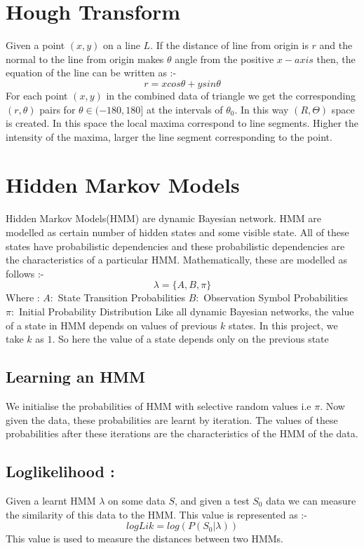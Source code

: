\documentclass[a4paper, 10pt, notitlepage]{report}
\begin{document}
\chapter{Hough Transform}
\hspace*{10pt} Given a point $(x, y)$ on a line $L$. If the distance of line from origin is $r$ and the normal to the line from origin makes $\theta$ angle from the positive $x-axis$ then, the equation of the line can be written as :-\\
$$r = x cos\theta + y sin\theta$$
For each point $(x,y)$ in the combined data of triangle we get the corresponding $(r, \theta)$ pairs for $\theta \in (-180, 180]$ at the intervals of $\theta _ 0$. In this way $(R, \Theta)$ space is created. In this space the local maxima correspond to line segments. Higher the intensity of the maxima, larger the line segment corresponding to the point.\\

\chapter{Hidden Markov Models}
Hidden Markov Models(HMM) are dynamic Bayesian network. HMM are modelled as certain number of hidden states and some visible state. All of these states have probabilistic dependencies and these probabilistic dependencies are the characteristics of a particular HMM. Mathematically, these are modelled as follows :-\\
$$\lambda = \{A, B, \pi \}$$
Where : 
\hspace*{20pt} $A :$ State Transition Probabilities 
\hspace*{20pt} $B :$ Observation Symbol Probabilities
\hspace*{20pt} $\pi :$ Initial Probability Distribution
Like all dynamic Bayesian networks, the value of a state in HMM depends on values of  previous $k$ states. In this project, we take $k$ as $1$. So here the value of a state depends only on the previous state

\section{Learning an HMM }
We initialise the probabilities of HMM with selective random values i.e $\pi$. Now given the data, these probabilities are learnt by iteration. The values of these probabilities after these iterations are the characteristics of the HMM of the data.

\section{Loglikelihood :}
Given a learnt HMM $\lambda $ on some data $S$, and given a test $S_0$ data we can measure the similarity of this data to the HMM. This value is represented as :- \\
$$logLik = log(P(S_0 | \lambda))$$
This value is used to measure the distances between two HMMs.\\
\end{document}
